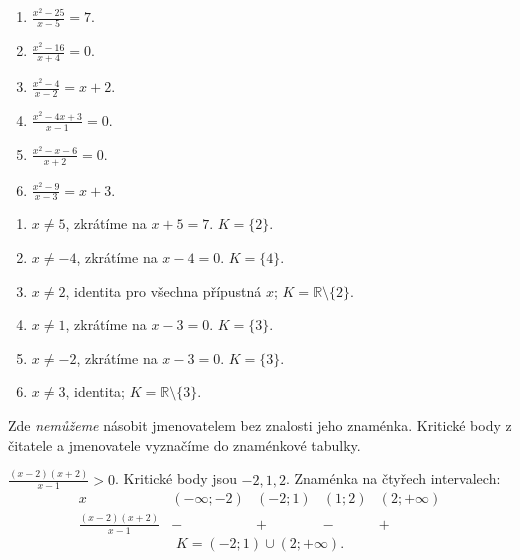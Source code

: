 \documentclass[11pt,a4paper]{article}
\begin{document}
\begin{zadaniReseniBox}[title={Domácí úkol}]
\begin{enumerate}[label=\alph*)]
\item $\frac{x^2-25}{x-5}=7$.
\item $\frac{x^2-16}{x+4}=0$.
\item $\frac{x^2-4}{x-2}=x+2$.
\item $\frac{x^2-4x+3}{x-1}=0$.
\item $\frac{x^2-x-6}{x+2}=0$.
\item $\frac{x^2-9}{x-3}=x+3$.
\end{enumerate}
\tcblower
\begin{enumerate}[label=\alph*)]
\item $x\ne5$, zkrátíme na $x+5=7$. $K=\{2\}$.
\item $x\ne-4$, zkrátíme na $x-4=0$. $K=\{4\}$.
\item $x\ne2$, identita pro všechna přípustná $x$; $K=\mathbb R\setminus\{2\}$.
\item $x\ne1$, zkrátíme na $x-3=0$. $K=\{3\}$.
\item $x\ne-2$, zkrátíme na $x-3=0$. $K=\{3\}$.
\item $x\ne3$, identita; $K=\mathbb R\setminus\{3\}$.
\end{enumerate}
\end{zadaniReseniBox}
Zde \emph{nemůžeme} násobit jmenovatelem bez znalosti jeho znaménka.
Kritické body z čitatele a jmenovatele vyznačíme do znaménkové tabulky.
\begin{zadaniReseniBox}[title={Rozšíření 1}]
$\frac{(x-2)(x+2)}{x-1}>0$.
\tcblower
Kritické body jsou $-2,1,2$. Znaménka na čtyřech intervalech:
\[\begin{array}{c|cccc}
x&(-\infty;-2)&(-2;1)&(1;2)&(2;+\infty)\\\hline
\frac{(x-2)(x+2)}{x-1}&-&+&-&+
\end{array}\]
\[K=(-2;1)\cup(2;+\infty).\]
\end{zadaniReseniBox}
\end{document}
